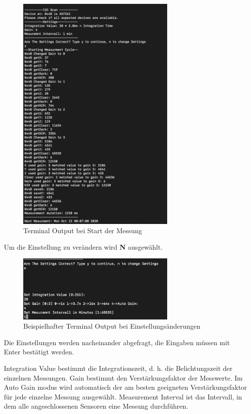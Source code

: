 \begin{figure}[H]
\centering
\includegraphics[width=0.7\textwidth]{img/handbuch/y_start_measurement}
\caption{Terminal Output bei Start der Messung }
\label{fig:Start-der-Messung}
\end{figure}

Um die Einstellung zu verändern wird \textbf{N} ausgewählt.\\
\begin{figure}[H]
\centering
\includegraphics[width=0.7\textwidth]{img/handbuch/n_change_settings}
\caption{Beispielhafter Terminal Output bei Einstellungsänderungen}
\label{fig:changesettings}
\end{figure}
\noindent Die Einstellungen werden nacheinander abgefragt, die Eingaben müssen mit Enter bestätigt werden.\medskip

\noindent Integration Value bestimmt die Integrationszeit, d. h. die Belichtungszeit der einzelnen Messungen.
Gain bestimmt den Verstärkungsfaktor der Messwerte. Im Auto Gain modus wird automatisch der am besten geeigneten Verstärkungsfaktor für jede einzelne Messung ausgewählt.
Measurement Interval ist das Intervall, in dem alle angeschlossenen Sensoren eine Messung durchführen.
